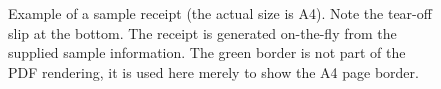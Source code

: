 \documentclass[12pt,twoside]{article}
\begin{document}
\begin{enumerate}[(i)]
\begin{figure}[!htb]
\begin{center}
\caption{Example of a sample receipt (the actual size is A4).
Note the tear-off slip at the bottom. The receipt is generated
on-the-fly from the supplied sample information. The green border
is not part of the PDF rendering, it is used here merely to show
the A4 page border.\label{fig:samplereceipt}}
\end{center}
\end{figure}


\end{enumerate}
\end{document}
